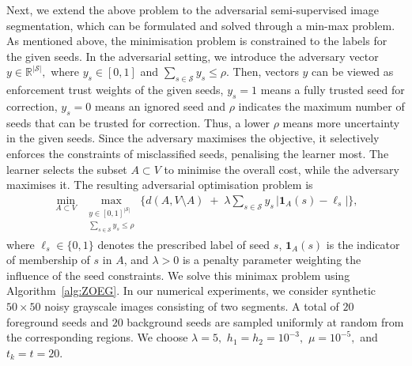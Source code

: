 \documentclass{article}
\theoremstyle{plain}
\theoremstyle{definition}
\theoremstyle{remark}
\newcommand{\R}{\mathbb{R}}
\begin{document}
Next, we extend the above problem to the adversarial semi-supervised image segmentation, which can be formulated and solved through a min-max problem. As mentioned above, the minimisation problem is constrained to the labels for 
the given seeds. In the adversarial setting, we introduce the adversary vector $y\in\R^{|\mathcal{S}|},$ where $y_s\in[0,1]$ and $\sum_{s\in \mathcal{S}}
y_s
\leq \rho.$ Then, vectors %
$y$ can be viewed as enforcement trust weights of the given seeds, %
$y_s=1$ means a fully trusted seed for correction, %
$y_s=0$ means an ignored seed and %
$\rho$ indicates the maximum number of seeds that can be trusted for correction. Thus, a lower $\rho$ means more uncertainty in the given seeds. Since the adversary maximises the objective, it selectively enforces the constraints of misclassified seeds, penalising the learner most. The learner selects the subset $A\subset V$ to minimise the overall cost, while the adversary maximises it. The resulting adversarial optimisation problem is
\begin{align*}
\min_{A \subset V}\;
\max_{\substack{y \in [0,1]^{|\mathcal{S}|}\\ \sum_{s\in {\mathcal{S}}} y_s \le \rho}}
\Bigg\{
d(A, V \setminus A)
\;+\;
\lambda \sum_{s \in {\mathcal{S}}} y_s \, \lvert \mathbf{1}_{A}(s) - \ell_s \rvert
\Bigg\},
\end{align*}
where $\ell_s \in \{0,1\}$ denotes the prescribed label of seed $s$, $\mathbf{1}_{A}(s)$ is the indicator of membership of $s$ in $A$, and $\lambda>0$ is a penalty parameter weighting the influence of the seed constraints.
We solve this minimax problem using Algorithm~\ref{alg:ZOEG}.
In our numerical experiments, we consider synthetic $50\times50$ noisy grayscale images consisting of two segments. A total of $20$ foreground seeds and $20$ background seeds are sampled uniformly at random from the corresponding regions. We choose $\lambda=5,$ $h_1=h_2=10^{-3},$ $\mu=10^{-5},$ and $t_k=t=20.$
\end{document}
